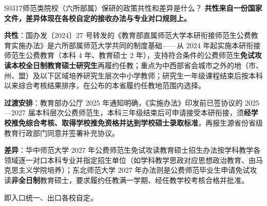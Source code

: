 \begin{qa}{S0317}{师范类院校（六所部属）保研的政策共性和差异是什么？}
\textbf{共性来自一份国家文件，差异体现在各校自定的接收办法与专业对口规则上。}

\textbf{共性}：国办发〔2024〕27 号转发的《教育部直属师范大学本研衔接师范生公费教育实施办法》是六所部属师范大学共同的制度基础——从 2024 年起实施本研衔接师范生公费教育（本科 4 年、教育硕士 2 年），支持符合条件的公费师范生\textbf{免试攻读本校全日制教育硕士研究生}再履约任教；重点为中西部省会城市之外的地（市、州、盟）及以下区域培养研究生层次中小学教师；研究生一年级课程结束后按本科以来综合考核结果排序，在公布的本省履约任教地范围内选择。

\textbf{过渡安排}：教育部办公厅 2025 年通知明确，《实施办法》印发前已签协议的 2025—2027 届本科层次公费师范生，本科三年级结束后可申请接受本研衔接，须\textbf{经学校推免综合考核、取得学校推免资格并达到学校硕士录取标准}，再报生源省份省级教育行政部门同意并签署补充协议。

\textbf{差异}：华中师范大学 2027 年公费师范生免试攻读教育硕士招生办法按学科教学各领域逐一对口本科专业并指定招生单位（如学科教学思政对应思想政治教育、由马克思主义学院培养）；东北师范大学 2027 年办法则是公费师范毕业生申请免试攻读\textbf{非全日制}教育硕士，要求履约任教满一学期、经任教学校考核合格并批准。

即入口统一、出口各校自定。
\end{qa}

